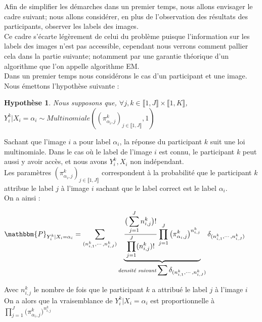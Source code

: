 \documentclass[frenchb]{report}
\newcommand{\1}{\mathbbm{1}}
\newcommand{\prob}{\mathbbm{P}}
\newtheorem{hyp}{Hypothèse}
\theoremstyle{definition}\newtheorem{defn}{Définition}
\theoremstyle{definition}\newtheorem{exm}{Exemple}
\theoremstyle{definition}\newtheorem{nota}{Notation}
\theoremstyle{definition}\newtheorem{rem}{Remarque}
\begin{document}
Afin de simplifier les démarches dans un premier temps, nous allons envisager le cadre suivant; nous allons considérer, en plus de l'observation des résultats des participants, observer les labels des images. \\
Ce cadre s'écarte légèrement de celui du problème puisque l'information sur les labels des images n'est pas accessible, cependant nous verrons comment pallier cela dans la partie suivante; notamment par une garantie théorique d'un algorithme que l'on appelle algorithme EM. \\
Dans un premier temps nous considérons le cas d'un participant et une image.\\

Nous émettons l'hypothèse suivante : 

\begin{hyp}
	Nous supposons que, $\forall j,k \in \llbracket 1,J \rrbracket \times \llbracket 1,K \rrbracket$, $Y^k_i | X_i = \alpha_i \sim Multinomiale((\pi^k_{\alpha_i,j})_{j \in \llbracket 1,J \rrbracket},1)$
\end{hyp}

Sachant que l'image $i$ a pour label $\alpha_i$, la réponse du participant $k$ suit une loi multinomiale. Dans le cas où le label de l'image $i$ est connu, le participant $k$ peut aussi y avoir accès, et nous avons $Y^k_i, X_i $ non indépendant. \\

Les paramètres $(\pi^k_{\alpha_i,j})_{j \in \llbracket 1,J \rrbracket}$ correspondent à la probabilité que le participant $k$  attribue le label $j$ à l'image $i$ sachant que le label correct est le label $\alpha_i$.\\

\newpage
On a ainsi :

\begin{center}
$\prob_{Y^k_i|X_i = \alpha_i} = \displaystyle \sum_{(n^k_{i,1}, \cdots, n^k_{i,J})} \underbrace{\frac{\big(\displaystyle \sum_{j=1}^J n^k_{i,j}\big)!}{\displaystyle \prod_{j=1}^J (n^k_{i,j})!}\displaystyle \prod_{j=1}^J \big(\pi^k_{\alpha_i,j}\big)^{n^k_{i,j}}}_{\textit{densité suivant} \displaystyle \sum \delta_{(n^k_{i,1}, \cdots, n^k_{i,J})}} \delta_{(n^k_{i,1}, \cdots, n^k_{i,J})}$
\end{center}

Avec $n^k_{i,j}$ le nombre de fois que le participant $k$ a attribué le label $j$ à l'image $i$\\

On a alors que la vraisemblance de $Y^k_i | X_i = \alpha_i$ est proportionnelle à $\displaystyle \prod_{j=1}^J \big(\pi^k_{\alpha_i,j}\big)^{n^k_{i,j}}$\\
\end{document}
